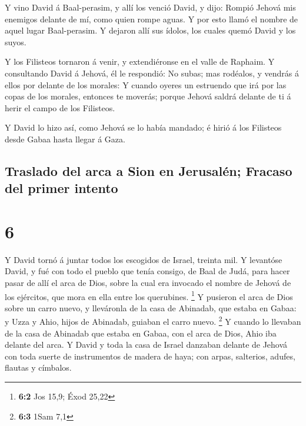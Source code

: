  Y vino David á Baal-perasim, y allí los venció David, y
dijo: Rompió Jehová mis enemigos delante de mí, como quien rompe aguas.
Y por esto llamó el nombre de aquel lugar Baal-perasim. 
Y dejaron allí sus ídolos, los cuales quemó David y los suyos.

 Y los Filisteos tornaron á venir, y extendiéronse en el
valle de Raphaim.  Y consultando David á Jehová, él le
respondió: No subas; mas rodéalos, y vendrás á ellos por delante de los
morales:  Y cuando oyeres un estruendo que irá por las
copas de los morales, entonces te moverás; porque Jehová saldrá delante
de ti á herir el campo de los Filisteos.

 Y David lo hizo así, como Jehová se lo había mandado; é
hirió á los Filisteos desde Gabaa hasta llegar á Gaza.

\hypertarget{traslado-del-arca-a-sion-en-jerusaluxe9n-fracaso-del-primer-intento}{%
\subsection{Traslado del arca a Sion en Jerusalén; Fracaso del primer
intento}\label{traslado-del-arca-a-sion-en-jerusaluxe9n-fracaso-del-primer-intento}}

\hypertarget{section-5}{%
\section{6}\label{section-5}}

 Y David tornó á juntar todos los escogidos de Israel,
treinta mil.  Y levantóse David, y fué con todo el pueblo
que tenía consigo, de Baal de Judá, para hacer pasar de allí el arca de
Dios, sobre la cual era invocado el nombre de Jehová de los ejércitos,
que mora en ella entre los querubines. \footnote{\textbf{6:2} Jos 15,9;
  Éxod 25,22}  Y pusieron el arca de Dios sobre un carro
nuevo, y lleváronla de la casa de Abinadab, que estaba en Gabaa: y Uzza
y Ahio, hijos de Abinadab, guiaban el carro nuevo. \footnote{\textbf{6:3}
  1Sam 7,1}  Y cuando lo llevaban de la casa de Abinadab
que estaba en Gabaa, con el arca de Dios, Ahio iba delante del arca.
 Y David y toda la casa de Israel danzaban delante de
Jehová con toda suerte de instrumentos de madera de haya; con arpas,
salterios, adufes, flautas y címbalos.

